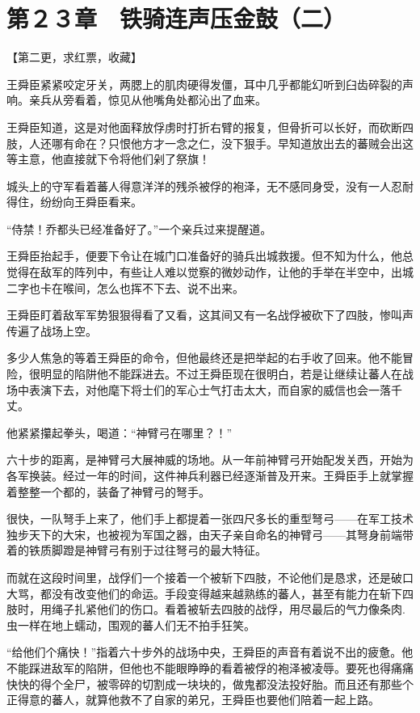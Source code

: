 \section{第２３章　铁骑连声压金鼓（二）}

【第二更，求红票，收藏】

王舜臣紧紧咬定牙关，两腮上的肌肉硬得发僵，耳中几乎都能幻听到臼齿碎裂的声响。亲兵从旁看着，惊见从他嘴角处都沁出了血来。

王舜臣知道，这是对他面释放俘虏时打折右臂的报复，但骨折可以长好，而砍断四肢，人还哪有命在？只恨他方才一念之仁，没下狠手。早知道放出去的蕃贼会出这等主意，他直接就下令将他们剁了祭旗！

城头上的守军看着蕃人得意洋洋的残杀被俘的袍泽，无不感同身受，没有一人忍耐得住，纷纷向王舜臣看来。

“侍禁！乔都头已经准备好了。”一个亲兵过来提醒道。

王舜臣抬起手，便要下令让在城门口准备好的骑兵出城救援。但不知为什么，他总觉得在敌军的阵列中，有些让人难以觉察的微妙动作，让他的手举在半空中，出城二字也卡在喉间，怎么也挥不下去、说不出来。

王舜臣盯着敌军军势狠狠得看了又看，这其间又有一名战俘被砍下了四肢，惨叫声传遍了战场上空。

多少人焦急的等着王舜臣的命令，但他最终还是把举起的右手收了回来。他不能冒险，很明显的陷阱他不能踩进去。不过王舜臣现在很明白，若是让继续让蕃人在战场中表演下去，对他麾下将士们的军心士气打击太大，而自家的威信也会一落千丈。

他紧紧攥起拳头，喝道：“神臂弓在哪里？！”

六十步的距离，是神臂弓大展神威的场地。从一年前神臂弓开始配发关西，开始为各军换装。经过一年的时间，这件神兵利器已经逐渐普及开来。王舜臣手上就掌握着整整一个都的，装备了神臂弓的弩手。

很快，一队弩手上来了，他们手上都提着一张四尺多长的重型弩弓——在军工技术独步天下的大宋，也被视为军国之器，由天子亲自命名的神臂弓——其弩身前端带着的铁质脚蹬是神臂弓有别于过往弩弓的最大特征。

而就在这段时间里，战俘们一个接着一个被斩下四肢，不论他们是恳求，还是破口大骂，都没有改变他们的命运。手段变得越来越熟练的蕃人，甚至有能力在斩下四肢时，用绳子扎紧他们的伤口。看着被斩去四肢的战俘，用尽最后的气力像条肉.虫一样在地上蠕动，围观的蕃人们无不拍手狂笑。

“给他们个痛快！”指着六十步外的战场中央，王舜臣的声音有着说不出的疲惫。他不能踩进敌军的陷阱，但他也不能眼睁睁的看着被俘的袍泽被凌辱。要死也得痛痛快快的得个全尸，被零碎的切割成一块块的，做鬼都没法投好胎。而且还有那些个正得意的蕃人，就算他救不了自家的弟兄，王舜臣也要他们陪着一起上路。

